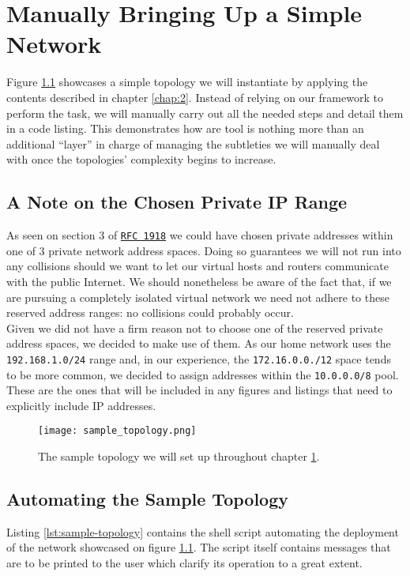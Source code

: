 \chapter{Manually Bringing Up a Simple Network} \label{chap:3}
    Figure \ref{fig:sample-topology} showcases a simple topology we will instantiate by applying the contents described in chapter \ref{chap:2}. Instead of relying on our framework to perform the task, we will manually carry out all the needed steps and detail them in a code listing. This demonstrates how are tool is nothing more than an additional ``layer'' in charge of managing the subtleties we will manually deal with once the topologies' complexity begins to increase.\\

    \section{A Note on the Chosen Private IP Range}
        As seen on section $3$ of \href{https://datatracker.ietf.org/doc/html/rfc1918#section-3}{\texttt{RFC 1918}} we could have chosen private addresses within one of $3$ private network address spaces. Doing so guarantees we will not run into any collisions should we want to let our virtual hosts and routers communicate with the public Internet. We should nonetheless be aware of the fact that, if we are pursuing a completely isolated virtual network we need not adhere to these reserved address ranges: no collisions could probably occur.\\

        Given we did not have a firm reason not to choose one of the reserved private address spaces, we decided to make use of them. As our home network uses the \texttt{192.168.1.0/24} range and, in our experience, the \texttt{172.16.0.0./12} space tends to be more common, we decided to assign addresses within the \texttt{10.0.0.0/8} pool. These are the ones that will be included in any figures and listings that need to explicitly include IP addresses.\\

    \begin{figure}
        \centering
        \texttt{[image: sample\_topology.png]}
        \caption{The sample topology we will set up throughout chapter \ref{chap:3}.}
        \label{fig:sample-topology}
    \end{figure}

    \section{Automating the Sample Topology}
        Listing \ref{lst:sample-topology} contains the shell script automating the deployment of the network showcased on figure \ref{fig:sample-topology}. The script itself contains messages that are to be printed to the user which clarify its operation to a great extent.\\

